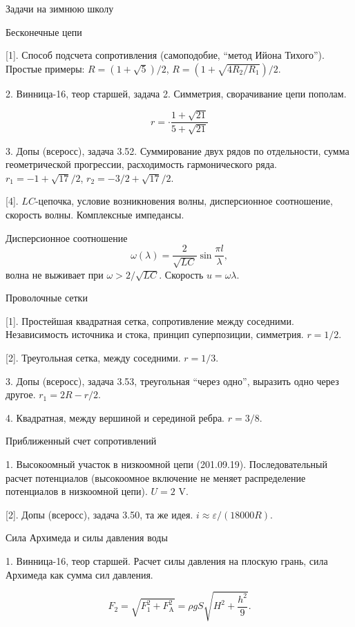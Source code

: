 \documentclass[12pt,a4paper]{article}
\begin{document}
\begin{center}
\LARGE{Задачи на зимнюю школу}
\end{center}
\vspace{6mm}

{\large{Бесконечные цепи}}

[1]. Способ подсчета сопротивления (самоподобие, ``метод Ийона Тихого''). Простые примеры: $R=(1+\sqrt5)/2$, $R=(1+\sqrt{4R_2/R_1})/2$.

2. Винница-16, теор старшей, задача 2. Симметрия, сворачивание цепи пополам.

$$r=\cdot\frac{1+\sqrt{21}}{5+\sqrt{21}}$$

3. Допы (всеросс), задача 3.52. Суммирование двух рядов по отдельности, сумма геометрической прогрессии, расходимость гармонического ряда. $r_1=-1+\sqrt{17}/2$, $r_2=-3/2+\sqrt{17}/2$.

[4]. $LC$-цепочка, условие возникновения волны, дисперсионное соотношение, скорость волны. Комплексные импедансы.

Дисперсионное соотношение
$$
  \omega(\lambda)=\frac{2}{\sqrt{LC}}\sin\frac{\pi l}{\lambda},
$$
волна не выживает при $\omega>2/\sqrt{LC}$. Скорость $u=\omega \lambda$.

{\large{Проволочные сетки}}

[1]. Простейшая квадратная сетка, сопротивление между соседними. Независимость источника и стока, принцип суперпозиции, симметрия. $r=1/2$.

[2]. Треугольная сетка, между соседними. $r=1/3$.

3. Допы (всеросс), задача 3.53, треугольная ``через одно'', выразить одно через другое. $r_1=2R-r/2$.

4. Квадратная, между вершиной и серединой ребра. $r=3/8$.

{\large{Приближенный счет сопротивлений}}

1. Высокоомный участок в низкоомной цепи (201.09.19). Последовательный расчет потенциалов (высокоомное включение не меняет распределение потенциалов в низкоомной цепи). $U=2$ V.

[2]. Допы (всеросс), задача 3.50, та же идея. $i\approx \varepsilon/(18000R)$.

{\large{Сила Архимеда и силы давления воды}}

1. Винница-16, теор старшей. Расчет силы давления на плоскую грань, сила Архимеда как сумма сил давления.

$$
  F_2=\sqrt{F_1^2+F_\text{A}^2}=\rho gS\sqrt{H^2+\frac{h^2}{9}}.
$$
\end{document}
